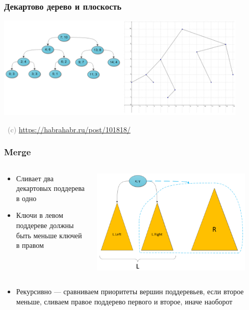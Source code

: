 \documentclass[xetex,mathserif,serif]{beamer}
\newcommand{\attribution}[1] {
    \vspace{-5mm}\begin{flushright}\begin{scriptsize}\textcolor{gray}{\textcopyright\, #1}\end{scriptsize}\end{flushright}
}
\begin{document}
    \begin{frame}
        \frametitle{Декартово дерево и плоскость}
        \begin{center}
            \includegraphics[width=0.9\textwidth]{treap-and-plain.png}
            \attribution{(c) \url{https://habrahabr.ru/post/101818/}}
        \end{center}
    \end{frame}

    \begin{frame}
        \frametitle{Merge}
        \begin{columns}
            \begin{column}{0.3\textwidth}
                \begin{itemize}
                    \item Сливает два декартовых поддерева в одно
                    \item Ключи в левом поддереве должны быть меньше ключей в правом
                \end{itemize}
            \end{column}
            \begin{column}{0.7\textwidth}
                \begin{center}
                    \includegraphics[width=0.9\textwidth]{treap-merge.png}
                \end{center}
            \end{column}
        \end{columns}
        \begin{itemize}
            \item Рекурсивно --- сравниваем приоритеты вершин поддеревьев, если второе меньше, сливаем правое поддерево первого и второе, иначе наоборот
        \end{itemize}
    \end{frame}
\end{document}
